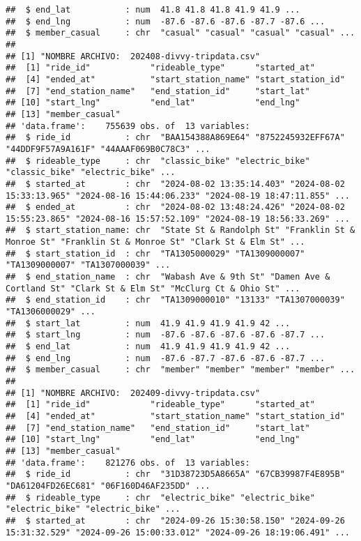 \documentclass[
]{article}
\begin{document}
\begin{verbatim}
##  $ end_lat           : num  41.8 41.8 41.8 41.9 41.9 ...
##  $ end_lng           : num  -87.6 -87.6 -87.6 -87.7 -87.6 ...
##  $ member_casual     : chr  "casual" "casual" "casual" "casual" ...
## 
## [1] "NOMBRE ARCHIVO:  202408-divvy-tripdata.csv"
##  [1] "ride_id"            "rideable_type"      "started_at"        
##  [4] "ended_at"           "start_station_name" "start_station_id"  
##  [7] "end_station_name"   "end_station_id"     "start_lat"         
## [10] "start_lng"          "end_lat"            "end_lng"           
## [13] "member_casual"     
## 'data.frame':    755639 obs. of  13 variables:
##  $ ride_id           : chr  "BAA154388A869E64" "8752245932EFF67A" "44DDF9F57A9A161F" "44AAAF069B0C78C3" ...
##  $ rideable_type     : chr  "classic_bike" "electric_bike" "classic_bike" "electric_bike" ...
##  $ started_at        : chr  "2024-08-02 13:35:14.403" "2024-08-02 15:33:13.965" "2024-08-16 15:44:06.233" "2024-08-19 18:47:11.855" ...
##  $ ended_at          : chr  "2024-08-02 13:48:24.426" "2024-08-02 15:55:23.865" "2024-08-16 15:57:52.109" "2024-08-19 18:56:33.269" ...
##  $ start_station_name: chr  "State St & Randolph St" "Franklin St & Monroe St" "Franklin St & Monroe St" "Clark St & Elm St" ...
##  $ start_station_id  : chr  "TA1305000029" "TA1309000007" "TA1309000007" "TA1307000039" ...
##  $ end_station_name  : chr  "Wabash Ave & 9th St" "Damen Ave & Cortland St" "Clark St & Elm St" "McClurg Ct & Ohio St" ...
##  $ end_station_id    : chr  "TA1309000010" "13133" "TA1307000039" "TA1306000029" ...
##  $ start_lat         : num  41.9 41.9 41.9 41.9 42 ...
##  $ start_lng         : num  -87.6 -87.6 -87.6 -87.6 -87.7 ...
##  $ end_lat           : num  41.9 41.9 41.9 41.9 42 ...
##  $ end_lng           : num  -87.6 -87.7 -87.6 -87.6 -87.7 ...
##  $ member_casual     : chr  "member" "member" "member" "member" ...
## 
## [1] "NOMBRE ARCHIVO:  202409-divvy-tripdata.csv"
##  [1] "ride_id"            "rideable_type"      "started_at"        
##  [4] "ended_at"           "start_station_name" "start_station_id"  
##  [7] "end_station_name"   "end_station_id"     "start_lat"         
## [10] "start_lng"          "end_lat"            "end_lng"           
## [13] "member_casual"     
## 'data.frame':    821276 obs. of  13 variables:
##  $ ride_id           : chr  "31D38723D5A8665A" "67CB39987F4E895B" "DA61204FD26EC681" "06F160D46AF235DD" ...
##  $ rideable_type     : chr  "electric_bike" "electric_bike" "electric_bike" "electric_bike" ...
##  $ started_at        : chr  "2024-09-26 15:30:58.150" "2024-09-26 15:31:32.529" "2024-09-26 15:00:33.012" "2024-09-26 18:19:06.491" ...

\end{verbatim}
\end{document}
